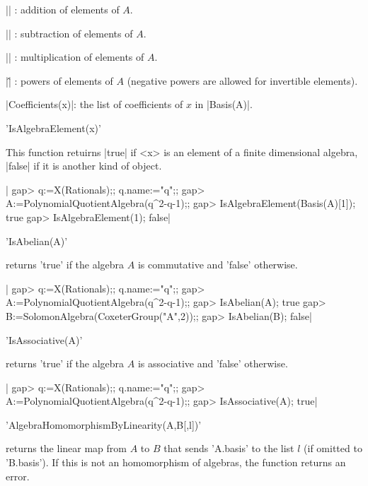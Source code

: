 |\+| : addition of elements of $A$.

|\-| : subtraction of elements of $A$.

|\*| : multiplication of elements of $A$.

|\^| : powers of elements of $A$ (negative powers are allowed
for invertible elements).

|Coefficients(x)|: the list of coefficients of $x$ in |Basis(A)|.

'IsAlgebraElement(x)'

This function retuirns |true| if <x> is an element of a finite dimensional
algebra, |false| if it is another kind of object.

|    gap> q:=X(Rationals);; q.name:="q";;
    gap> A:=PolynomialQuotientAlgebra(q^2-q-1);;
    gap> IsAlgebraElement(Basis(A)[1]);
    true
    gap> IsAlgebraElement(1);
    false|

'IsAbelian(A)'

returns 'true' if the algebra $A$ is commutative and 'false' otherwise.

|    gap> q:=X(Rationals);; q.name:="q";;
    gap> A:=PolynomialQuotientAlgebra(q^2-q-1);;
    gap> IsAbelian(A);
    true
    gap> B:=SolomonAlgebra(CoxeterGroup("A",2));;
    gap> IsAbelian(B);
    false|

'IsAssociative(A)'

returns 'true' if the algebra $A$ is associative and 'false' otherwise.

|    gap> q:=X(Rationals);; q.name:="q";;
    gap> A:=PolynomialQuotientAlgebra(q^2-q-1);;
    gap> IsAssociative(A);
    true|

'AlgebraHomomorphismByLinearity(A,B[,l])'

returns the linear map from $A$ to $B$ that sends 'A.basis' to the list $l$
(if  omitted to 'B.basis'). If this is not an homomorphism of algebras, the
function returns an error.

